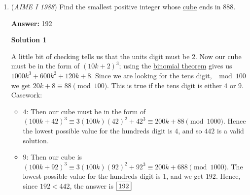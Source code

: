 \begin{enumerate}
 Proof that $f(x,y)=\mathrm{lcm}(x,y)$ is the only function instead of just using the fact that this is an AIME problem (Proof credited to AMSP's 101 Algebra Problems):

 FTSOC, suppose that there is another function $g(x,y)$ also satisfying the given conditions. Let $S$ be the set of all pairs of positive integers $(x,y)$ such that $f(x,y) \ne g(x,y)$, and let $(m,n)$ be such a pair with minimal sum $m+n$. It is clear that $m \ne n$, otherwise $f(m,n) = f(m,m) = m = g(m,m) = g(m,n)$. By symmetry, we can also assume that $n>m$. Note that 
 \[nf(m,n-m)=[m+(n-m)]f(m,n-m)\]
 \[=(n-m)f(m,m+(n-m))=(n-m)f(m,n)\]or 
 \[f(m,n-m=\dfrac{n-m}{n} \cdot f(m,n).\]Likewise, 
 \[g(m,n-m) = \dfrac{n-m}{n} \cdot g(m,n).\]Since $f(m,n) \ne g(m,n)$, $f(m,n-m) \ne g(m,n-m)$. Thus $(m,n-m) \in S$. But $(m,n-m)$ has a smaller sum then $(m,n)$, a contradiction. Therefore, $f(x,y) = \mathrm{lcm}(x,y)$ is the only solution.

 


	\item (\textit{AIME I 1988}) Find the smallest positive integer whose \href{https://artofproblemsolving.com/wiki/index.php?title=Perfect\_cube}{cube} ends in $888$.


 
 \textbf{Answer: }192



\textbf{Solution 1}

A little bit of checking tells us that the units digit must be 2. Now our cube must be in the form of $(10k + 2)^3$; using the \href{https://artofproblemsolving.com/wiki/index.php?title=Binomial\_theorem}{binomial theorem} gives us $1000k^3 + 600k^2 + 120k + 8$. Since we are looking for the tens digit, $\mod{100}$ we get $20k + 8 \equiv 88 \pmod{100}$. This is true if the tens digit is either $4$ or $9$. Casework:

 
            \begin{itemize}
        \item $4$: Then our cube must be in the form of $(100k + 42)^3 \equiv 3(100k)(42)^2 + 42^3 \equiv 200k + 88 \pmod{1000}$. Hence the lowest possible value for the hundreds digit is $4$, and so $442$ is a valid solution.
        \item $9$: Then our cube is $(100k + 92)^3 \equiv 3(100k)(92)^2 + 92^3 \equiv 200k + 688 \pmod{1000}$. The lowest possible value for the hundreds digit is $1$, and we get $192$. Hence, since $192 < 442$, the answer is $\fbox{192}$
            \end{itemize}
            




\end{enumerate}
